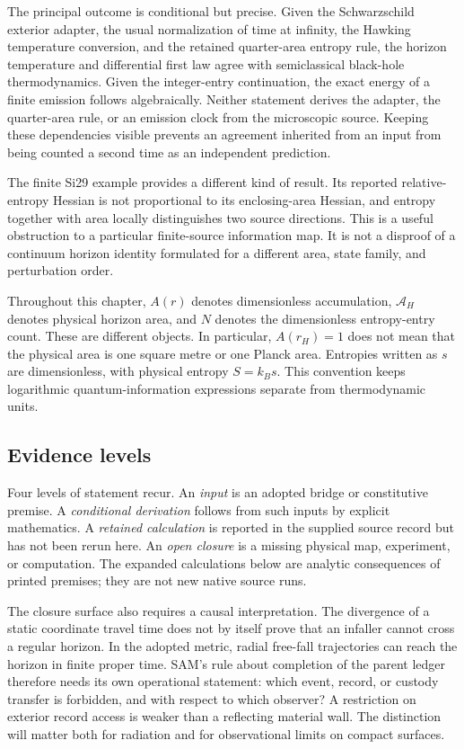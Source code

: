 The principal outcome is conditional but precise. Given the Schwarzschild exterior adapter, the usual normalization of time at infinity, the Hawking temperature conversion, and the retained quarter-area entropy rule, the horizon temperature and differential first law agree with semiclassical black-hole thermodynamics. Given the integer-entry continuation, the exact energy of a finite emission follows algebraically. Neither statement derives the adapter, the quarter-area rule, or an emission clock from the microscopic source. Keeping these dependencies visible prevents an agreement inherited from an input from being counted a second time as an independent prediction.

The finite Si29 example provides a different kind of result. Its reported relative-entropy Hessian is not proportional to its enclosing-area Hessian, and entropy together with area locally distinguishes two source directions. This is a useful obstruction to a particular finite-source information map. It is not a disproof of a continuum horizon identity formulated for a different area, state family, and perturbation order.

Throughout this chapter, $A(r)$ denotes dimensionless accumulation, $\mathcal A_H$ denotes physical horizon area, and $N$ denotes the dimensionless entropy-entry count. These are different objects. In particular, $A(r_H)=1$ does not mean that the physical area is one square metre or one Planck area. Entropies written as $s$ are dimensionless, with physical entropy $S=k_Bs$. This convention keeps logarithmic quantum-information expressions separate from thermodynamic units.

\subsection{Evidence levels}
Four levels of statement recur. An \emph{input} is an adopted bridge or constitutive premise. A \emph{conditional derivation} follows from such inputs by explicit mathematics. A \emph{retained calculation} is reported in the supplied source record but has not been rerun here. An \emph{open closure} is a missing physical map, experiment, or computation. The expanded calculations below are analytic consequences of printed premises; they are not new native source runs.

The closure surface also requires a causal interpretation. The divergence of a static coordinate travel time does not by itself prove that an infaller cannot cross a regular horizon. In the adopted metric, radial free-fall trajectories can reach the horizon in finite proper time. SAM's rule about completion of the parent ledger therefore needs its own operational statement: which event, record, or custody transfer is forbidden, and with respect to which observer? A restriction on exterior record access is weaker than a reflecting material wall. The distinction will matter both for radiation and for observational limits on compact surfaces.

